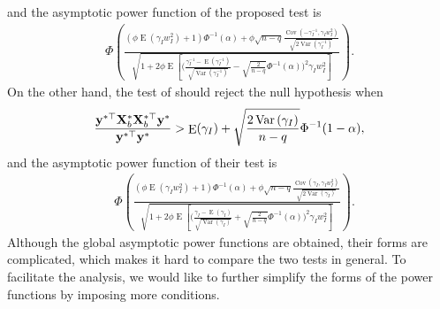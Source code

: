 \documentclass[smallextended]{svjour3}       %
\DeclareMathOperator{\myE}{E}
\DeclareMathOperator{\myVar}{Var}
\DeclareMathOperator{\myCov}{Cov}
\newcommand{\By}{\mathbf{y}}    \newcommand{\Bz}{\mathbf{z}}
\begin{document}
and the asymptotic power function of the proposed test is
\begin{equation*}\label{eq:powerProposed}
    \begin{split}
    \Phi\left( 
        \frac{
            \left( \phi \myE (\gamma_I w_I^2) + 1 \right)
            \Phi^{-1}(\alpha)
            +
            \phi
            \sqrt{n-q}
            \frac{
                \myCov\left( - \gamma_I^{-1}, \gamma_I w_I^2 \right)
                }{
                    \sqrt{2 \myVar(\gamma_I^{-1})}
                }
        }{
            \sqrt{
                1
                +
                2 \phi
        \myE\left[ 
            \Big( \frac{\gamma_I^{-1} -\myE(\gamma_I^{-1})}{\sqrt{\myVar\left(\gamma_I^{-1}\right)}} -\sqrt{\frac{2}{n-q}} \Phi^{-1}(\alpha) \Big)^2
        \gamma_I w_I^2
    \right]
            }
        } 
    \right).
    \end{split}
\end{equation*}
On the other hand, the test of \cite{Goeman2006} should reject the null hypothesis when
\begin{equation*}
        \frac{
            \By^{*\top} \BX_b^* \BX_b^{*\top} \By^*
        }{
            \By^{*\top} \By^*
        } 
        >
        \myE (\gamma_I)
        +\sqrt{
            \frac{2\myVar\left( \gamma_I \right)}{n-q} 
        }
        \Phi^{-1}(1-\alpha),
\end{equation*}
and the asymptotic power function of their test is
\begin{equation*}\label{eq:powerTheirs}
    \begin{split}
    &\Phi\left( 
        \frac{
            \left( \phi \myE (\gamma_I w_I^2) + 1 \right)
            \Phi^{-1}(\alpha)
            +
            \phi
            \sqrt{n-q}
            \frac{
                \myCov\left( \gamma_I, \gamma_I w_I^2 \right)
            }{
                \sqrt{2 \myVar(\gamma_I)}
            }
        }{
            \sqrt{
                1 
                +
                2 \phi
    \myE\left[ 
        \Big( \frac{\gamma_I -\myE(\gamma_I)}{\sqrt{\myVar(\gamma_I)}} +\sqrt{\frac{2}{n-q}} \Phi^{-1}(\alpha) \Big)^2
        \gamma_I w_I^2
    \right]
            }
        } 
    \right).
    \end{split}
\end{equation*}
Although the global asymptotic power functions are obtained, their forms are complicated, which makes it hard to compare the two tests in general.
To facilitate the analysis, we would like to further simplify the forms of the power functions by imposing more conditions.
\end{document}
